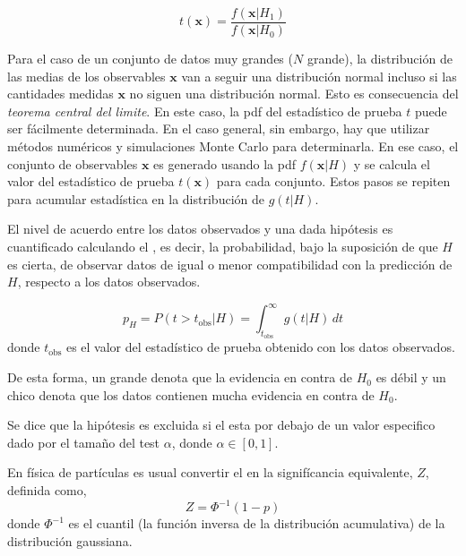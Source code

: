 
\begin{equation}
  t(\bm{x}) = \frac{f(\bm{x}|H_1)}{f(\bm{x}|H_0)}
\end{equation}


Para el caso de un conjunto de datos muy grandes ($N$ grande), la distribución de las medias
de los observables $\bm{x}$ van a seguir una distribución normal incluso si las cantidades
medidas $\bm{x}$ no siguen una distribución normal. Esto es consecuencia del \emph{teorema
  central del limite}. En este caso, la pdf del estadístico de prueba $t$ puede ser
fácilmente determinada. En el caso general, sin embargo, hay que utilizar métodos numéricos y
simulaciones Monte Carlo para determinarla. En ese caso, el conjunto de observables $\bm{x}$ es
generado usando la pdf $f(\bm{x}|H)$ y se calcula el valor del estadístico de prueba $t(\bm{x})$
para cada conjunto. Estos pasos se repiten para acumular estadística en la distribución de
$g(t|H)$.


El nivel de acuerdo entre los datos observados y una dada hipótesis es cuantificado calculando
el \emph{\pvalue}, es decir, la probabilidad, bajo la suposición de que $H$ es cierta,
de observar datos de igual o menor compatibilidad con la predicción de $H$,
respecto a los datos observados.

\begin{equation}
  p_H = P(t>t_\text{obs}|H) = \int_{t_\text{obs}}^{\infty} g(t|H) \, dt
\end{equation}
%
donde $t_\text{obs}$ es el valor del estadístico de prueba obtenido con los datos observados.

De esta forma, un {\pvalue} grande denota que la evidencia en contra de $H_0$ es
débil y un {\pvalue} chico denota que los datos contienen mucha evidencia en contra de $H_0$.

Se dice que la hipótesis es excluida si el {\pvalue} esta por debajo de un valor
especifico dado por el tama\~no del test $\alpha$, donde $\alpha \in [0,1]$.

En física de partículas es usual convertir el {\pvalue} en la signifícancia equivalente, $Z$,
definida como,
\begin{equation}
  Z = \Phi^{-1}(1-p)
\end{equation}
%
donde $\Phi^{-1}$ es el cuantil (la función inversa de la distribución acumulativa) de la distribución
gaussiana.


